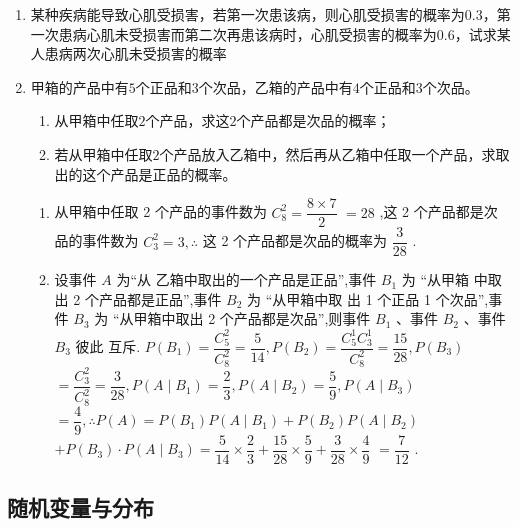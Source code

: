 \begin{enumerate}
\item 某种疾病能导致心肌受损害，若第一次患该病，则心肌受损害的概率为$0.3$，第一次患病心肌未受损害而第二次再患该病时，心肌受损害的概率为$0.6$，试求某人患病两次心肌未受损害的概率

\item 甲箱的产品中有$5$个正品和$3$个次品，乙箱的产品中有$4$个正品和$3$个次品。
\begin{enumerate}
\item 从甲箱中任取$2$个产品，求这$2$个产品都是次品的概率；
\item 若从甲箱中任取$2$个产品放入乙箱中，然后再从乙箱中任取一个产品，求取出的这个产品是正品的概率。
\end{enumerate}

\begin{jieda}
    \begin{enumerate}
        \item 从甲箱中任取 2 个产品的事件数为 ${{C}}_{8}^{2} = \dfrac{8 \times  7}{2}$
$= {28}$ ,这 2 个产品都是次品的事件数为 ${{C}}_{3}^{2} = 3,\therefore$ 这 2
个产品都是次品的概率为 $\dfrac{3}{28}$ . 
        \item 设事件 $A$ 为“从
乙箱中取出的一个产品是正品”,事件 ${B}_{1}$ 为 “从甲箱
中取出 2 个产品都是正品”,事件 ${B}_{2}$ 为 “从甲箱中取
出 1 个正品 1 个次品”,事件 ${B}_{3}$ 为 “从甲箱中取出 2
个产品都是次品”,则事件 ${B}_{1}$ 、事件 ${B}_{2}$ 、事件 ${B}_{3}$ 彼此
互斥. $P\left( {B}_{1}\right)  = \dfrac{{{C}}_{5}^{2}}{{{C}}_{8}^{2}} = \dfrac{5}{14},P\left( {B}_{2}\right)  = \dfrac{{{C}}_{5}^{1}{{C}}_{3}^{1}}{{{C}}_{8}^{2}} = \dfrac{15}{28},P\left( {B}_{3}\right)$
$= \dfrac{{{C}}_{3}^{2}}{{{C}}_{8}^{2}} = \dfrac{3}{28},P\left( {A \mid  {B}_{1}}\right)  = \dfrac{2}{3},P\left( {A \mid  {B}_{2}}\right)  = \dfrac{5}{9},P\left( {A \mid  {B}_{3}}\right)$
$= \dfrac{4}{9},\therefore P\left( A\right)  = P\left( {B}_{1}\right) P\left( {A \mid  {B}_{1}}\right)  + P\left( {B}_{2}\right) P\left( {A \mid  {B}_{2}}\right)$
$+ P\left( {B}_{3}\right)  \cdot  P\left( {A \mid  {B}_{3}}\right)  = \dfrac{5}{14} \times  \dfrac{2}{3} + \dfrac{15}{28} \times  \dfrac{5}{9} + \dfrac{3}{28} \times  \dfrac{4}{9}$
$= \dfrac{7}{12}$ .
    \end{enumerate}
\end{jieda}


\end{enumerate}

\clearpage
\subsection*{随机变量与分布}

